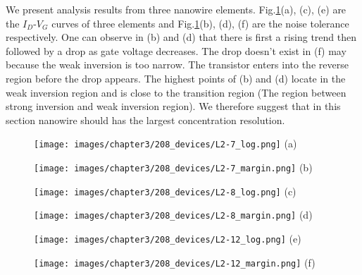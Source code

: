 We present analysis results from three nanowire elements.
Fig.\ref{fig:SD_Device}(a), (c), (e) are the $I_D$-$V_G$ curves of three elements and Fig.\ref{fig:SD_Device}(b), (d), (f) are the noise tolerance respectively.
One can observe in (b) and (d) that there is first a rising trend then followed by a drop as gate voltage decreases.
The drop doesn't exist in (f) may because the weak inversion is too narrow.
The transistor enters into the reverse region before the drop appears.
The highest points of (b) and (d) locate in the weak inversion region and is close to the transition region (The region between strong inversion and weak inversion region).
We therefore suggest that in this section nanowire should has the largest concentration resolution.



\begin{figure}[h!]
    \centering
    \begin{minipage}[t][20cm][t]{1\textwidth}
        \begin{minipage}[t]{0.3\textwidth}
            \centering
            \texttt{[image: images/chapter3/208\_devices/L2-7\_log.png]}
            (a)
        \end{minipage}
        \hfill
        \begin{minipage}[t]{0.3\textwidth}
            \centering
            \texttt{[image: images/chapter3/208\_devices/L2-7\_margin.png]}
            (b)
        \end{minipage}
        \vfill
        \begin{minipage}[t]{0.3\textwidth}
            \centering
            \texttt{[image: images/chapter3/208\_devices/L2-8\_log.png]}
            (c)
        \end{minipage}
        \hfill
        \begin{minipage}[t]{0.3\textwidth}
            \centering
            \texttt{[image: images/chapter3/208\_devices/L2-8\_margin.png]}
            (d)
        \end{minipage}
        \vfill
        \begin{minipage}[t]{0.3\textwidth}
            \centering
            \texttt{[image: images/chapter3/208\_devices/L2-12\_log.png]}
            (e)
        \end{minipage}
        \hfill
        \begin{minipage}[t]{0.3\textwidth}
            \centering
            \texttt{[image: images/chapter3/208\_devices/L2-12\_margin.png]}
            (f)
        \end{minipage}

    \end{minipage}
    \caption{}
    \label{fig:SD_Device}
\end{figure}
\FloatBarrier

